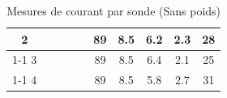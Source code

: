 \begin{table}[H]
{\begin{tabular}{|c|c|c|c|c|c|c|c|c|c|}
            2         &                                                            &                           &                                                         &                                                          & 89                                                      & 8.5                                                                 & 6.2                                                              & 2.3    & 28                                                                \\ \cline{1-1} \cline{6-10}
            3         &                                                            &                           &                                                         &                                                          & 89                                                      & 8.5                                                                 & 6.4                                                              & 2.1    & 25                                                                \\ \cline{1-1} \cline{6-10}
            4         &                                                            &                           &                                                         &                                                          & 89                                                      & 8.5                                                                 & 5.8                                                              & 2.7    & 31                                                                \\ \hline
        \end{tabular}%
    }
    \caption{Mesures de courant par sonde (Sans poids)}
    \label{tab:sans_poids_sonde}
\end{table}

